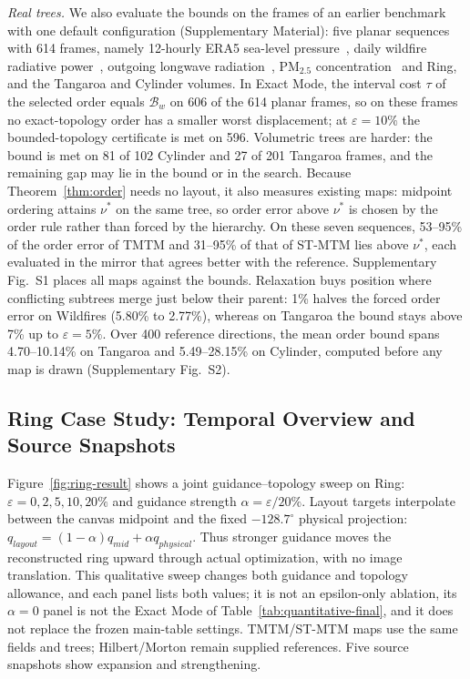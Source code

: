 \documentclass[review]{vgtc}
\begin{document}
\emph{Real trees.} We also evaluate the bounds on the frames of an earlier benchmark with one default configuration (Supplementary Material): five planar sequences with 614 frames, namely 12-hourly ERA5 sea-level pressure~\cite{Hersbach:2020:ERA5}, daily wildfire radiative power~\cite{Franke:2021:1DP}, outgoing longwave radiation~\cite{NOAA:OLR}, PM$_{2.5}$ concentration~\cite{Dong:2026:PM25} and Ring, and the Tangaroa and Cylinder volumes. In Exact Mode, the interval cost $\tau$ of the selected order equals $\mathcal{B}_w$ on 606 of the 614 planar frames, so on these frames no exact-topology order has a smaller worst displacement; at $\varepsilon=10\%$ the bounded-topology certificate is met on 596. Volumetric trees are harder: the bound is met on 81 of 102 Cylinder and 27 of 201 Tangaroa frames, and the remaining gap may lie in the bound or in the search. Because Theorem~\ref{thm:order} needs no layout, it also measures existing maps: midpoint ordering attains $\nu^*$ on the same tree, so order error above $\nu^*$ is chosen by the order rule rather than forced by the hierarchy. On these seven sequences, 53--95\% of the order error of TMTM and 31--95\% of that of ST-MTM lies above $\nu^*$, each evaluated in the mirror that agrees better with the reference. Supplementary Fig.~S1 places all maps against the bounds. Relaxation buys position where conflicting subtrees merge just below their parent: 1\% halves the forced order error on Wildfires (5.80\% to 2.77\%), whereas on Tangaroa the bound stays above 7\% up to $\varepsilon=5\%$. Over 400 reference directions, the mean order bound spans 4.70--10.14\% on Tangaroa and 5.49--28.15\% on Cylinder, computed before any map is drawn (Supplementary Fig.~S2).

\subsection{Ring Case Study: Temporal Overview and Source Snapshots}

Figure~\ref{fig:ring-result} shows a joint guidance--topology sweep on Ring: $\varepsilon=0,2,5,10,20\%$ and guidance strength $\alpha=\varepsilon/20\%$. Layout targets interpolate between the canvas midpoint and the fixed $-128.7^\circ$ physical projection: $q_{layout}=(1-\alpha)q_{mid}+\alpha q_{physical}$. Thus stronger guidance moves the reconstructed ring upward through actual optimization, with no image translation. This qualitative sweep changes both guidance and topology allowance, and each panel lists both values; it is not an epsilon-only ablation, its $\alpha=0$ panel is not the Exact Mode of Table~\ref{tab:quantitative-final}, and it does not replace the frozen main-table settings. TMTM/ST-MTM maps use the same fields and trees; Hilbert/Morton remain supplied references. Five source snapshots show expansion and strengthening.
\end{document}
